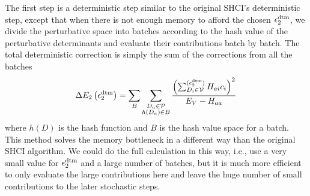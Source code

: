 \documentclass[%
reprint,
 superscriptaddress,
 amsmath,amssymb,
 aps,
]{revtex4-1}
\def\beq{\begin{eqnarray}}
\def\eeq{\end{eqnarray}}
\def\V{\mathcal{V}}
\def\P{\mathcal{P}}
\begin{document}
The first step is a deterministic step similar to the original SHCI's deterministic step,
except that when there is not enough memory to afford the
chosen $\epsilon_2^{\rm dtm}$, we divide the perturbative space into batches according to the hash value of the perturbative determinants and evaluate their contributions batch by batch.
The total deterministic correction is simply the sum of the corrections from all the batches
\beq
\Delta E_{2} \left(\epsilon_2^{\rm dtm} \right) = \sum_{B} \sum_{\substack{D_a \in \P \\ h(D_a)\in B}} \frac{\left(\sum^{(\epsilon_2^{\rm dtm})}_{D_i \in \V} H_{a i} c_{i}\right) ^{2}}{E_{V} - H_{a a}}
\eeq
where $h(D)$ is the hash function and $B$ is the hash value space for a batch.
This method solves the memory bottleneck in a different way than the original SHCI algorithm.
We could do the full calculation in this way, i.e., use a very small value for $\epsilon_2^{\rm dtm}$
{\color{black} and a large number of batches},
but it is much more efficient to only evaluate the large contributions here and leave the huge number of small contributions to the later stochastic steps.
\end{document}
